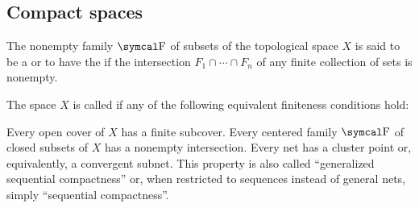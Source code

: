 \subsection{Compact spaces}\label{subsec:compact_spaces}

\begin{definition}\label{def:centered_family}\cite[123]{Engelking1989}
  The nonempty family \( \CF \) of subsets of the topological space \( X \) is said to be a  or to have the  if the intersection \( F_1 \cap \cdots \cap F_n \) of any finite collection of sets is nonempty.
\end{definition}

\begin{definition}\label{def:compact_space}\cite[123]{Engelking1989}
  The space \( X \) is called  if any of the following equivalent finiteness conditions hold:
  \begin{defenum}
     Every open cover of \( X \) has a finite subcover.
     Every centered family \( \CF \) of closed subsets of \( X \) has a nonempty intersection.
     Every net has a cluster point or, equivalently, a convergent subnet. This property is also called \enquote{generalized sequential compactness} or, when restricted to sequences instead of general nets, simply \enquote{sequential compactness}.
  \end{defenum}
\end{definition}
